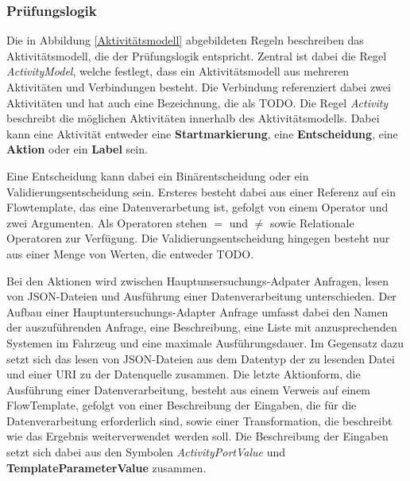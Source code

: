 \documentclass{article}
\begin{document}
    \subsubsection{Prüfungslogik}
    \label{Prüfungslogik}
    Die in Abbildung \ref{Aktivitätsmodell} abgebildeten Regeln beschreiben das Aktivitätsmodell, die der Prüfungslogik entspricht. \cite{99}
    Zentral ist dabei die Regel \textit{ActivityModel}, welche festlegt, dass ein Aktivitätsmodell aus mehreren Aktivitäten und Verbindungen besteht.
    Die Verbindung referenziert dabei zwei Aktivitäten und hat auch eine Bezeichnung, die als TODO.
    Die Regel \textit{Activity} beschreibt die möglichen Aktivitäten innerhalb des Aktivitätsmodells. 
    Dabei kann eine Aktivität entweder eine \textbf{Startmarkierung}, eine \textbf{Entscheidung}, eine \textbf{Aktion} oder ein \textbf{Label} sein.
    
    Eine Entscheidung kann dabei ein Binärentscheidung oder ein Validierungsentscheidung sein.
    Ersteres besteht dabei aus einer Referenz auf ein Flowtemplate, das eine Datenverarbetung ist, gefolgt von einem Operator und zwei Argumenten. 
    Als Operatoren stehen $=$ und $\neq$ sowie Relationale Operatoren zur Verfügung.
    Die Validierungsentscheidung hingegen besteht nur aus einer Menge von Werten, die entweder TODO.

    Bei den Aktionen wird zwischen Hauptunsersuchungs-Adpater Anfragen, lesen von JSON-Dateien und Ausführung einer Datenverarbeitung unterschieden.
    Der Aufbau einer Hauptuntersuchungs-Adapter Anfrage umfasst dabei den Namen der auszuführenden Anfrage, eine Beschreibung, eine Liste mit anzusprechenden Systemen im Fahrzeug und eine maximale Ausführungsdauer.
    Im Gegensatz dazu setzt sich das lesen von JSON-Dateien aus dem Datentyp der zu lesenden Datei und einer URI zu der Datenquelle zusammen.
    Die letzte Aktionform, die Ausführung einer Datenverarbeitung, besteht aus einem Verweis auf einem FlowTemplate, gefolgt von einer Beschreibung der Eingaben, die für die Datenverarbeitung erforderlich sind, sowie einer Transformation, die beschreibt wie das Ergebnis weiterverwendet werden soll.    
    Die Beschreibung der Eingaben setzt sich dabei aus den Symbolen \textit{ActivityPortValue} und \textbf{TemplateParameterValue} zusammen.
\end{document}

